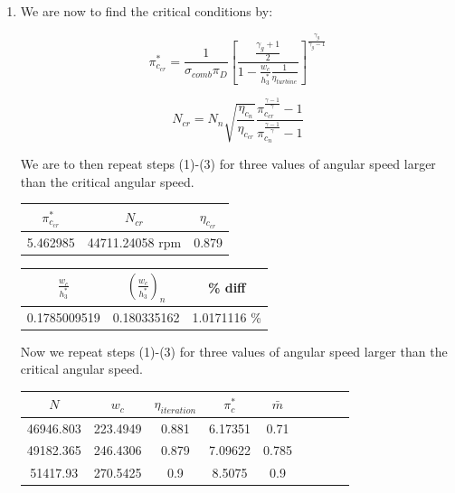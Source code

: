 \documentclass[titlepage]{article}
\begin{document}
\begin{enumerate}
    \item We are now to find the critical conditions by:
    
    \begin{equation}
      \pi_{c_{cr}}^{*} = \frac{1}{\sigma_{comb} \pi_{D}} \left[ \frac{\frac{\gamma_{g}+1}{2}}{1 - \frac{w_{c}}{h_{3}^{*}} \frac{1}{\eta_{turbine}}} \right]^{\frac{\gamma_{g}}{\gamma_{g}-1}}
    \end{equation}
  
    \begin{equation}
      N_{cr} = N_{n} \sqrt{\frac{\eta_{c_{n}}}{\eta_{c_{cr}}}} \frac{\pi_{c_{cr}}^{\frac{\gamma - 1}{\gamma}} -1}{\pi_{c_{n}}^{\frac{\gamma -1}{\gamma}} - 1}
    \end{equation}
  
    We are to then repeat steps (1)-(3) for three values of angular speed
    larger than the critical angular speed.
  
    \begin{center}
      \begin{tabular}{|c|c|c|}
        \hline
        $\pi_{c_{cr}}^{*}$ & $N_{cr}$ & $\eta_{c_{cr}}$ \\
        \hline
        5.462985 & 44711.24058 rpm & 0.879 \\
        \hline
      \end{tabular}
    \end{center}
  
    \begin{center}
      \begin{tabular}{|c|c|c|}
        \hline
        $\frac{w_{c}}{h_{3}^{*}}$ & $\left(\frac{w_{c}}{h_{3}^{*}}\right)_{n}$ & \% diff \\
        \hline
        0.1785009519 & 0.180335162 & 1.0171116 \% \\
        \hline
      \end{tabular}
    \end{center}
  
    Now we repeat steps (1)-(3) for three values of angular speed larger than the critical angular speed.
  
    \begin{center}
      \begin{tabular}{|c|c|c|c|c|c|c|c|c|}
        \hline
        $N$ & $w_{c}$ & $\eta_{iteration}$ & $\pi_{c}^{*}$ & $\bar{m}$ \\
        \hline
        46946.803 & 223.4949 & 0.881 & 6.17351 & 0.71 \\
        \hline
        49182.365 & 246.4306 & 0.879 & 7.09622 & 0.785 \\
        \hline
        51417.93	& 270.5425 & 0.9	& 8.5075	& 0.9 \\
        \hline
      \end{tabular}
    \end{center}
  

\end{enumerate}
\end{document}
